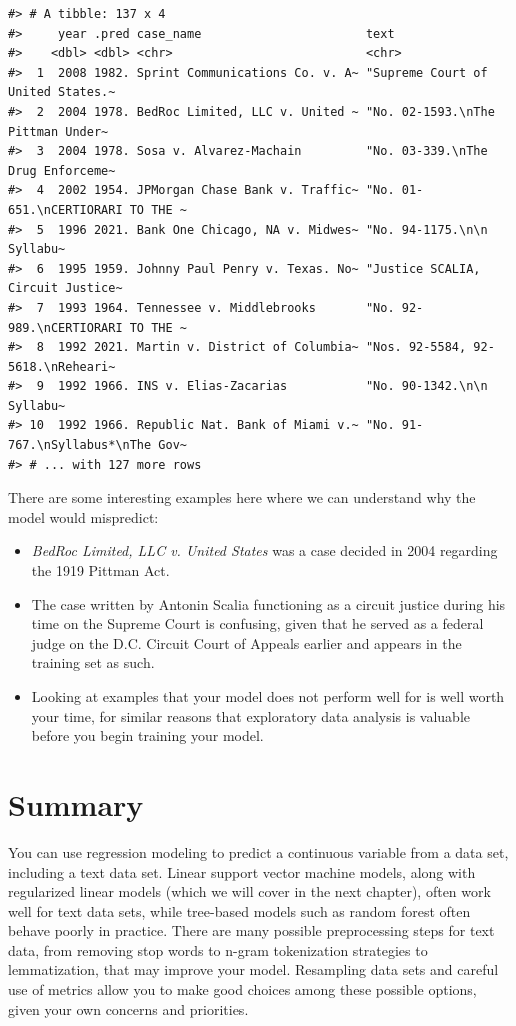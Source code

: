 \documentclass[
]{krantz}
\newenvironment{rmdblock}[1]
  {\begin{shaded*}
  \begin{itemize}[left = -1cm, labelsep = 1cm]
  \renewcommand{\labelitemi}{
    \raisebox{-.7\height}[0pt][0pt]{
      {\setkeys{Gin}{width=3em,keepaspectratio}\texttt{[image: images/\#1]}}
    }
  }
 
  \item
  }
  {
  \end{itemize}
  \end{shaded*}
  }
\newenvironment{rmdwarning}
  {\begin{rmdblock}{warning}}
  {\end{rmdblock}}
\begin{document}
\begin{verbatim}
#> # A tibble: 137 x 4
#>     year .pred case_name                       text                             
#>    <dbl> <dbl> <chr>                           <chr>                            
#>  1  2008 1982. Sprint Communications Co. v. A~ "Supreme Court of United States.~
#>  2  2004 1978. BedRoc Limited, LLC v. United ~ "No. 02-1593.\nThe Pittman Under~
#>  3  2004 1978. Sosa v. Alvarez-Machain         "No. 03-339.\nThe Drug Enforceme~
#>  4  2002 1954. JPMorgan Chase Bank v. Traffic~ "No. 01-651.\nCERTIORARI TO THE ~
#>  5  1996 2021. Bank One Chicago, NA v. Midwes~ "No. 94-1175.\n\n        Syllabu~
#>  6  1995 1959. Johnny Paul Penry v. Texas. No~ "Justice SCALIA, Circuit Justice~
#>  7  1993 1964. Tennessee v. Middlebrooks       "No. 92-989.\nCERTIORARI TO THE ~
#>  8  1992 2021. Martin v. District of Columbia~ "Nos. 92-5584, 92-5618.\nReheari~
#>  9  1992 1966. INS v. Elias-Zacarias           "No. 90-1342.\n\n        Syllabu~
#> 10  1992 1966. Republic Nat. Bank of Miami v.~ "No. 91-767.\nSyllabus*\nThe Gov~
#> # ... with 127 more rows
\end{verbatim}

There are some interesting examples here where we can understand why the model would mispredict:

\begin{itemize}
\item
  \emph{BedRoc Limited, LLC v. United States} was a case decided in 2004 regarding the 1919 Pittman Act.
\item
  The case written by Antonin Scalia functioning as a circuit justice during his time on the Supreme Court is confusing, given that he served as a federal judge on the D.C. Circuit Court of Appeals earlier and appears in the training set as such.
\end{itemize}

\begin{rmdwarning}
Looking at examples that your model does not perform well for is well
worth your time, for similar reasons that exploratory data analysis is
valuable before you begin training your model.
\end{rmdwarning}

\hypertarget{mlregressionsummary}{%
\section{Summary}\label{mlregressionsummary}}

You can use regression modeling to predict a continuous variable from a data set, including a text data set. Linear support vector machine models, along with regularized linear models (which we will cover in the next chapter), often work well for text data sets, while tree-based models such as random forest often behave poorly in practice. There are many possible preprocessing steps for text data, from removing stop words to n-gram tokenization strategies to lemmatization, that may improve your model. Resampling data sets and careful use of metrics allow you to make good choices among these possible options, given your own concerns and priorities.
\end{document}
